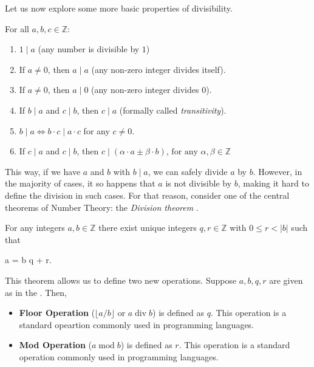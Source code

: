 \documentclass[../lecture-notes-148x210.tex]{subfiles}
\begin{document}
Let us now explore some more basic properties of divisibility. 

\begin{lemma}
    For all $a, b, c \in \mathbb{Z}$:
    \hfill
    \begin{enumerate}
        \item $1 \mid a$ (any number is divisible by $1$)
        \item If $a \neq 0$, then $a \mid a$ (any non-zero integer divides itself).
        \item If $a \neq 0$, then $a \mid 0$ (any non-zero integer divides $0$).
        \item If $b \mid a$ and $c \mid b$, then $c \mid a$ (formally called \emph{transitivity}).
        \item $b \mid a \iff b \cdot c \mid a \cdot c$ for any $c \neq 0$.
        \item If $c \mid a$ and $c \mid b$, then $c \mid (\alpha \cdot a \pm \beta \cdot b)$, $\text{for any } \alpha, \beta \in \mathbb{Z}$
    \end{enumerate}
\end{lemma}

This way, if we have $a$ and $b$ with $b \mid a$, we can safely divide $a$ by
$b$. However, in the majority of cases, it so happens that $a$ is not divisible
by $b$, making it hard to define the division in such cases. For that reason,
consider one of the central theorems of Number Theory: the \emph{Division
theorem} \cite[section 2]{Judson_2012}.

\begin{theorem}\label{th:division}
    For any integers $a,b \in \mathbb{Z}$ there exist unique integers $q, r \in \mathbb{Z}$ with $0 \leq r < |b|$ such that 
    \begin{xequation}
        a = b \cdot q + r.
    \end{xequation}
\end{theorem}

This theorem allows us to define two new operations. Suppose $a,b,q,r$ are given
as in the . Then,
\begin{itemize}
    \item \textbf{Floor Operation} ($\lfloor a/b \rfloor$ or $a \; \text{div} \; b$) is defined
    as $q$. This operation is a standard  opeartion commonly used in programming languages.
    \item \textbf{Mod Operation} ($a \; \text{mod} \; b$) is defined as $r$. This operation is a standard
 operation commonly used in programming languages. 
\end{itemize}
\end{document}
